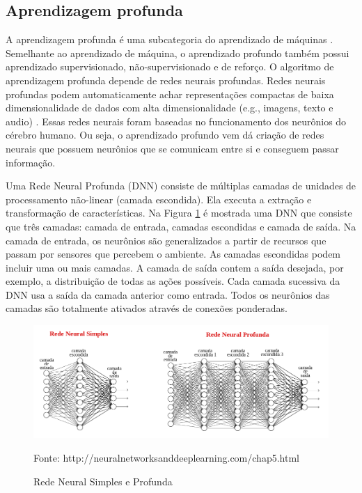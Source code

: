 \subsection{Aprendizagem profunda}

A aprendizagem profunda é uma subcategoria do aprendizado de máquinas \cite{lecun2015deep}.
Semelhante ao aprendizado de máquina, o aprendizado profundo também possui aprendizado supervisionado, não-supervisionado e de reforço.
O algoritmo de aprendizagem profunda depende de redes neurais profundas. 
Redes neurais profundas podem automaticamente achar representações compactas de baixa dimensionalidade de dados com alta dimensionalidade (e.g., imagens, texto e audio) \cite{arulkumaran2017brief}.
Essas redes neurais foram baseadas no funcionamento dos neurônios do cérebro humano. 
Ou seja, o aprendizado profundo vem dá criação de redes neurais que possuem neurônios que se comunicam entre si e conseguem passar informação. 

Uma Rede Neural Profunda (DNN) consiste de múltiplas camadas de unidades de processamento não-linear (camada escondida). Ela executa a extração e transformação de características. Na Figura \ref{fig:NN} é mostrada uma DNN que consiste que três camadas: camada de entrada, camadas escondidas e camada de saída. Na camada de entrada, os neurônios são generalizados a partir de recursos que passam por sensores que percebem o ambiente. As camadas escondidas podem incluir uma ou mais camadas. A camada de saída contem a saída desejada, por exemplo, a distribuição de todas as ações possíveis.
Cada camada sucessiva da DNN usa a saída da camada anterior como entrada.
Todos os neurônios das camadas são totalmente ativados através de conexões ponderadas.

\vspace{0.25cm}
\begin{figure}[H]
\caption{Rede Neural Simples e Profunda}
\centerline{\includegraphics[width=\columnwidth]{imagens/neural_network.png}}
\small{Fonte: http://neuralnetworksanddeeplearning.com/chap5.html}
\label{fig:NN}
\end{figure}

